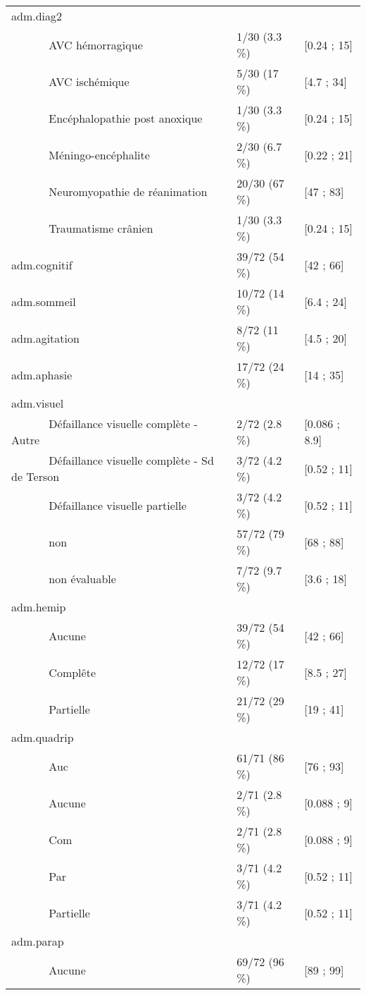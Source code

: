 \documentclass[]{article}
\begin{document}
\begin{longtable}{lll}
  adm.diag2 &   &   \\ 
  ~~~~~~ AVC hémorragique & 1/30 (3.3 \%) &  [0.24 ; 15] \\ 
  ~~~~~~ AVC ischémique & 5/30 (17 \%) &  [4.7 ; 34] \\ 
  ~~~~~~ Encéphalopathie post anoxique & 1/30 (3.3 \%) &  [0.24 ; 15] \\ 
  ~~~~~~ Méningo-encéphalite & 2/30 (6.7 \%) &  [0.22 ; 21] \\ 
  ~~~~~~ Neuromyopathie de réanimation & 20/30 (67 \%) &  [47 ; 83] \\ 
  ~~~~~~ Traumatisme crânien & 1/30 (3.3 \%) &  [0.24 ; 15] \\ 
  adm.cognitif & 39/72 (54 \%) &  [42 ; 66] \\ 
  adm.sommeil & 10/72 (14 \%) &  [6.4 ; 24] \\ 
  adm.agitation & 8/72 (11 \%) &  [4.5 ; 20] \\ 
  adm.aphasie & 17/72 (24 \%) &  [14 ; 35] \\ 
  adm.visuel &   &   \\ 
  ~~~~~~ Défaillance visuelle complète - Autre & 2/72 (2.8 \%) &  [0.086 ; 8.9] \\ 
  ~~~~~~ Défaillance visuelle complète - Sd de Terson & 3/72 (4.2 \%) &  [0.52 ; 11] \\ 
  ~~~~~~ Défaillance visuelle partielle & 3/72 (4.2 \%) &  [0.52 ; 11] \\ 
  ~~~~~~ non & 57/72 (79 \%) &  [68 ; 88] \\ 
  ~~~~~~ non évaluable & 7/72 (9.7 \%) &  [3.6 ; 18] \\ 
  adm.hemip &   &   \\ 
  ~~~~~~ Aucune & 39/72 (54 \%) &  [42 ; 66] \\ 
  ~~~~~~ Complête & 12/72 (17 \%) &  [8.5 ; 27] \\ 
  ~~~~~~ Partielle & 21/72 (29 \%) &  [19 ; 41] \\ 
  adm.quadrip &   &   \\ 
  ~~~~~~ Auc & 61/71 (86 \%) &  [76 ; 93] \\ 
  ~~~~~~ Aucune & 2/71 (2.8 \%) &  [0.088 ; 9] \\ 
  ~~~~~~ Com & 2/71 (2.8 \%) &  [0.088 ; 9] \\ 
  ~~~~~~ Par & 3/71 (4.2 \%) &  [0.52 ; 11] \\ 
  ~~~~~~ Partielle & 3/71 (4.2 \%) &  [0.52 ; 11] \\ 
  adm.parap &   &   \\ 
  ~~~~~~ Aucune & 69/72 (96 \%) &  [89 ; 99] \\ 

\end{longtable}
\end{document}
